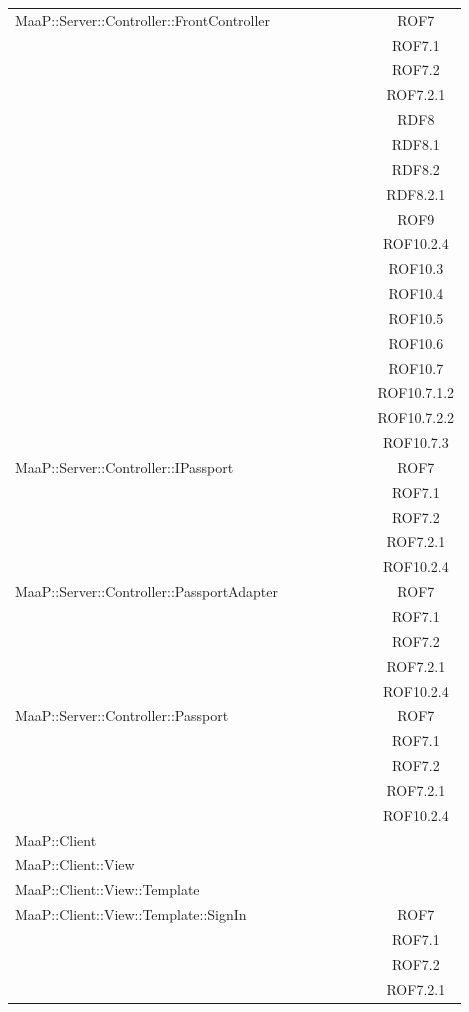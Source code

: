 \begin{center}
\begin{longtable}{|p{0.8\linewidth}|c|}
\midrule 
MaaP::Server::Controller::FrontController
& ROF7\\
& ROF7.1\\
& ROF7.2\\
& ROF7.2.1\\
& RDF8\\
& RDF8.1\\
& RDF8.2\\
& RDF8.2.1\\
& ROF9\\
& ROF10.2.4\\
& ROF10.3\\
& ROF10.4\\
& ROF10.5\\
& ROF10.6\\
& ROF10.7\\
& ROF10.7.1.2\\
& ROF10.7.2.2\\
& ROF10.7.3\\

\midrule 
MaaP::Server::Controller::IPassport
& ROF7\\
& ROF7.1\\
& ROF7.2\\
& ROF7.2.1\\
& ROF10.2.4\\

\midrule 
MaaP::Server::Controller::PassportAdapter 
& ROF7\\
& ROF7.1\\
& ROF7.2\\
& ROF7.2.1\\
& ROF10.2.4\\

\midrule 
MaaP::Server::Controller::Passport
& ROF7\\
& ROF7.1\\
& ROF7.2\\
& ROF7.2.1\\
& ROF10.2.4\\

\midrule 
MaaP::Client 
& \\

\midrule 
MaaP::Client::View 
& \\

\midrule 
MaaP::Client::View::Template
& \\

\midrule 
MaaP::Client::View::Template::SignIn
& ROF7\\
& ROF7.1\\
& ROF7.2\\
& ROF7.2.1\\


\end{longtable}
\end{center}
